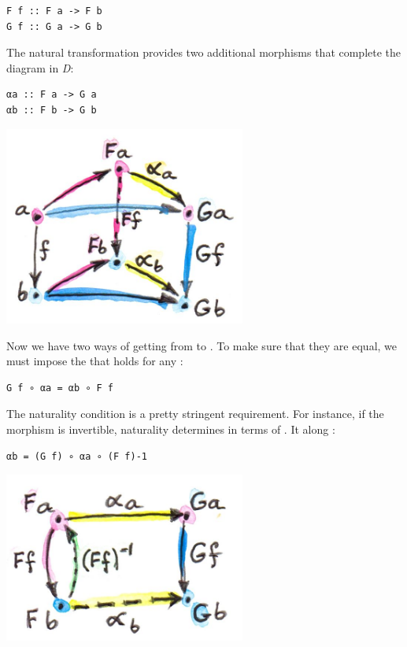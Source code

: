 \begin{verbatim}
F f :: F a -> F b
G f :: G a -> G b
\end{verbatim}

The natural transformation  provides two additional morphisms
that complete the diagram in \emph{D}:

\begin{verbatim}
αa :: F a -> G a
αb :: F b -> G b
\end{verbatim}

\includegraphics[width=3.12500in]{images/3_naturality.jpg}

Now we have two ways of getting from  to . To
make sure that they are equal, we must impose the  that holds for any :

\begin{verbatim}
G f ∘ αa = αb ∘ F f
\end{verbatim}

The naturality condition is a pretty stringent requirement. For
instance, if the morphism  is invertible, naturality
determines  in terms of . It 
 along :

\begin{verbatim}
αb = (G f) ∘ αa ∘ (F f)-1
\end{verbatim}

\includegraphics[width=3.12500in]{images/4_transport.jpg}

